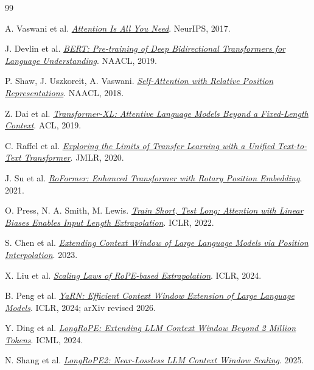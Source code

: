 \documentclass[UTF8,fontset=none,a4paper,10pt]{ctexart}
\begin{document}
\clearpage
\begin{thebibliography}{99}
\small
\setlength{\itemsep}{1pt}

A. Vaswani et al. \href{https://arxiv.org/abs/1706.03762}{\textit{Attention Is All You Need}}. NeurIPS, 2017.

J. Devlin et al. \href{https://arxiv.org/abs/1810.04805}{\textit{BERT: Pre-training of Deep Bidirectional Transformers for Language Understanding}}. NAACL, 2019.

P. Shaw, J. Uszkoreit, A. Vaswani. \href{https://aclanthology.org/N18-2074/}{\textit{Self-Attention with Relative Position Representations}}. NAACL, 2018.

Z. Dai et al. \href{https://arxiv.org/abs/1901.02860}{\textit{Transformer-XL: Attentive Language Models Beyond a Fixed-Length Context}}. ACL, 2019.

C. Raffel et al. \href{https://www.jmlr.org/papers/v21/20-074.html}{\textit{Exploring the Limits of Transfer Learning with a Unified Text-to-Text Transformer}}. JMLR, 2020.

J. Su et al. \href{https://arxiv.org/abs/2104.09864}{\textit{RoFormer: Enhanced Transformer with Rotary Position Embedding}}. 2021.

O. Press, N. A. Smith, M. Lewis. \href{https://arxiv.org/abs/2108.12409}{\textit{Train Short, Test Long: Attention with Linear Biases Enables Input Length Extrapolation}}. ICLR, 2022.

S. Chen et al. \href{https://arxiv.org/abs/2306.15595}{\textit{Extending Context Window of Large Language Models via Position Interpolation}}. 2023.

X. Liu et al. \href{https://arxiv.org/abs/2310.05209}{\textit{Scaling Laws of RoPE-based Extrapolation}}. ICLR, 2024.

B. Peng et al. \href{https://arxiv.org/abs/2309.00071}{\textit{YaRN: Efficient Context Window Extension of Large Language Models}}. ICLR, 2024; arXiv revised 2026.

Y. Ding et al. \href{https://arxiv.org/abs/2402.13753}{\textit{LongRoPE: Extending LLM Context Window Beyond 2 Million Tokens}}. ICML, 2024.

N. Shang et al. \href{https://arxiv.org/abs/2502.20082}{\textit{LongRoPE2: Near-Lossless LLM Context Window Scaling}}. 2025.


\end{thebibliography}
\end{document}
